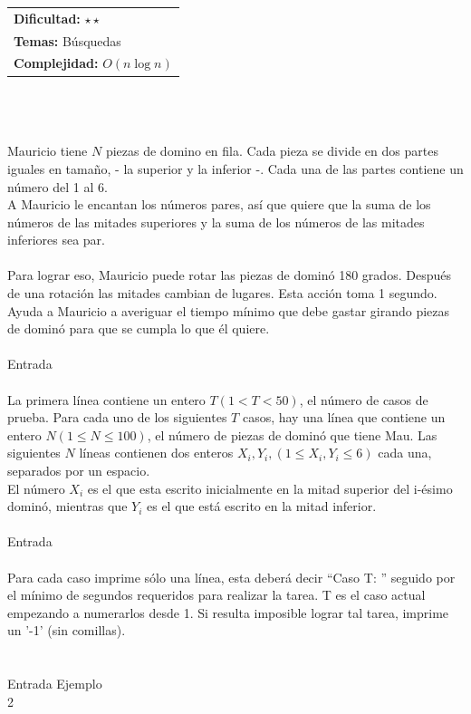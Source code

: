 \documentclass[12pt]{article}
\begin{document}
\hfill
\begin{tabular}{@{}l@{}}
\textbf{Dificultad:} $\star\star$ \\
\textbf{Temas:} Búsquedas \\
\textbf{Complejidad:} $O(n \log n)$
\end{tabular}\\
\\
\\Mauricio tiene $N$ piezas de domino en fila. Cada pieza se divide en dos partes iguales en tamaño, - la superior y la inferior -. Cada una de las partes contiene un número del 1 al 6.
\\A Mauricio le encantan los números pares, así que quiere que la suma de los números de las mitades superiores y la suma de los números de las mitades inferiores sea par.\\
\\Para lograr eso, Mauricio puede rotar las piezas de dominó 180 grados. Después de una rotación las mitades cambian de lugares. Esta acción toma 1 segundo. Ayuda a Mauricio a averiguar el tiempo mínimo que debe gastar girando piezas de dominó para que se cumpla lo que él quiere.\\
\\
\textrm{\large Entrada}
\\
\\La primera línea contiene un entero $T(1 < T < 50)$, el número de casos de prueba. Para cada uno de los siguientes $T$ casos, hay una línea que contiene un entero $N(1 ≤ N ≤ 100)$, el número de piezas de dominó que tiene Mau. Las siguientes $N$ líneas contienen dos enteros $X_i, Y_i,(1 ≤ X_i, Y_i ≤ 6)$ cada una, separados por un espacio. \\El número $X_i$ es el que esta escrito inicialmente en la mitad superior del i-ésimo dominó, mientras que $Y_i$ es el que está escrito en la mitad inferior.\\
\\
\textrm{\large Entrada}
\\
\\Para cada caso imprime sólo una línea, esta deberá decir “Caso T: ” seguido por el mínimo de segundos requeridos para realizar la tarea. T es el caso actual empezando a numerarlos desde 1. Si resulta imposible lograr tal tarea, imprime un ’-1’ (sin comillas).\\
\\
\\
\textrm{\large Entrada Ejemplo}
\\
2\\
\end{document}
